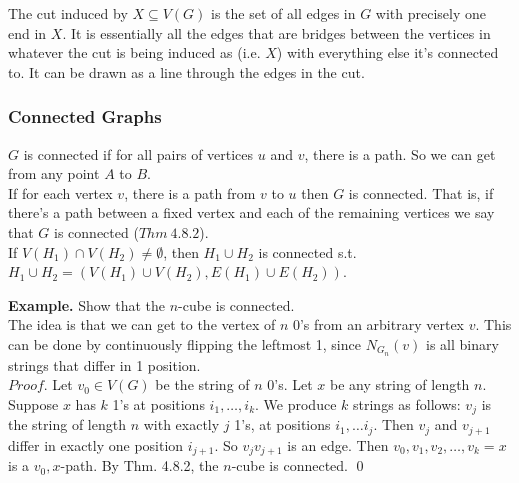 \documentclass[11pt]{article}
\newenvironment{eg}[1]{
\begin{tcolorbox}[colback = white!15, arc=0pt,outer arc=0pt, colframe = black]
{\color{black} \textbf{Example.} #1} \\[5pt]
}
{
\end{tcolorbox}
}
\newcommand{\nl}{\\[5pt]}
\begin{document}
The cut induced by $X \subseteq V(G)$ is the set of all edges in $G$ with precisely one end in $X$. It is essentially all the edges that are bridges between the vertices in whatever the cut is being induced as (i.e. $X$) with everything else it's connected to. It can be drawn as a line through the edges in the cut.


\subsubsection{Connected Graphs}
$G$ is connected if for all pairs of vertices $u$ and $v$, there is a path. So we can get from any point $A$ to $B$. \nl
If for each vertex $v$, there is a path from $v$ to $u$ then $G$ is connected. That is, if there's a path between a fixed vertex and each of the remaining vertices we say that $G$ is connected ($Thm \: 4.8.2$). \nl
If $V(H_1) \cap V(H_2) \neq \emptyset$, then $H_1 \cup H_2$ is connected s.t. $H_1 \cup H_2 = (V(H_1) \cup V(H_2), E(H_1) \cup E(H_2))$. 

\begin{eg}{Show that the $n$-cube is connected.}
The idea is that we can get to the vertex of $n$ 0's from an arbitrary vertex $v$. This can be done by continuously flipping the leftmost 1, since $N_{G_n}(v)$ is all binary strings that differ in 1 position. \nl
$Proof.$ Let $v_0 \in V(G)$ be the string of $n$ 0's. Let $x$ be any string of length $n$. Suppose $x$ has $k$ 1's at positions $i_1, \dots, i_k$. We produce $k$ strings as follows: $v_j$ is the string of length $n$ with exactly $j$ 1's, at positions $i_1, \dots i_j$. Then $v_j$ and $v_{j+1}$ differ in exactly one position $i_{j+1}$. So $v_jv_{j+1}$ is an edge. Then $v_0, v_1, v_2, \dots, v_k = x$ is a $v_0,x$-path. By Thm. 4.8.2, the $n$-cube is connected. \qed 
\end{eg}

\end{document}
